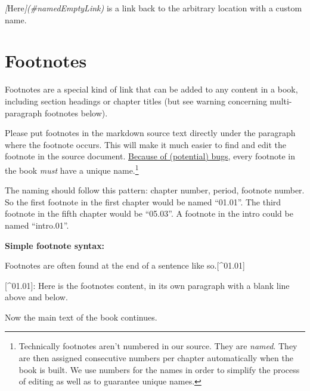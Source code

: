 \documentclass[
  english,
]{book}
\newenvironment{Shaded}{\begin{snugshade}}{\end{snugshade}}
\newcommand{\CommentTok}[1]{\textcolor[rgb]{0.56,0.35,0.01}{\textit{#1}}}
\newcommand{\NormalTok}[1]{#1}
\newcommand{\OtherTok}[1]{\textcolor[rgb]{0.56,0.35,0.01}{#1}}
\begin{document}
\begin{Shaded}
\begin{Highlighting}[]
\CommentTok{[}\OtherTok{Here}\CommentTok{](\#namedEmptyLink)}\NormalTok{ is a link back to the arbitrary location with a custom name. }
\end{Highlighting}
\end{Shaded}

\hypertarget{footnotes}{%
\section{Footnotes}\label{footnotes}}

Footnotes are a special kind of link that can be added to any content in a book, including section headings or chapter titles (but see warning concerning multi-paragraph footnotes below).

Please put footnotes in the markdown source text directly under the paragraph where the footnote occurs. This will make it much easier to find and edit the footnote in the source document. \href{https://community.rstudio.com/t/how-can-i-enable-the-file-scope-option/83741}{Because of (potential) bugs}, every footnote in the book \emph{must} have a unique name.\footnote{Technically footnotes aren't numbered in our source. They are \emph{named}. They are then assigned consecutive numbers per chapter automatically when the book is built. We use numbers for the names in order to simplify the process of editing as well as to guarantee unique names.}

The naming should follow this pattern: chapter number, period, footnote number. So the first footnote in the first chapter would be named ``01.01''. The third footnote in the fifth chapter would be ``05.03''. A footnote in the intro could be named ``intro.01''.

\textbf{Simple footnote syntax:}

\begin{Shaded}
\begin{Highlighting}[]
\NormalTok{Footnotes are often found at the end of a sentence like so.}\OtherTok{[\^{}01.01]}

\OtherTok{[\^{}01.01]: }\NormalTok{Here is the footnote\textquotesingle{}s content, in its own paragraph with a blank line above and below.}

\NormalTok{Now the main text of the book continues.}
\end{Highlighting}
\end{Shaded}
\end{document}
